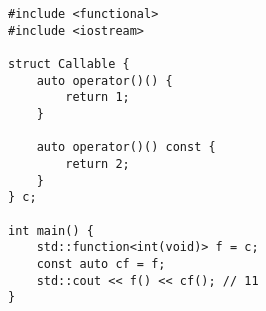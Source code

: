 \begin{lstlisting}[title=\href{https://godbolt.org/z/f1fE7G}{\texttt{godbolt.org/z/f1fE7G}}]
#include <functional>
#include <iostream>

struct Callable {
    auto operator()() {
        return 1; 
    }

    auto operator()() const {
        return 2;
    }
} c;

int main() {
    std::function<int(void)> f = c;
    const auto cf = f;
    std::cout << f() << cf(); // 11
}
\end{lstlisting}
